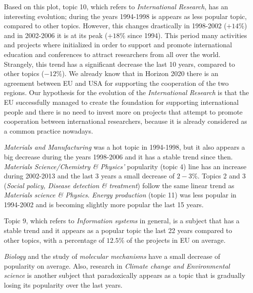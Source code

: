 \documentclass[12pt]{report}
\begin{document}
Based on this plot, topic 10, which refers to \emph{International Research},
has an interesting evolution; during the years 1994-1998 is appears as
less popular topic, compared to other topics. However, this changes
drastically in 1998-2002 ($+14\%$) and in 2002-2006 it is at its peak
($+18\%$ since 1994). This period
many activities and projects where initialized in order to support and
promote international education and conferences to attract researchers
from all over the world. Strangely, this trend has a significant
decrease the last 10 years, compared to other topics ($-12\%$). We
already know that in Horizon 2020 there is an agreement between EU and
USA for supporting the cooperation of the two regions. Our hypothesis
for the evolution of the \emph{International Research} is that the EU
successfully managed to create the foundation for supporting
international people and there is no need to invest more on projects
that attempt to promote cooperation between international researchers,
because it is already considered as a common practice nowadays.

\emph{Materials and Manufacturing} was a hot topic in 1994-1998, but it also
appears a big decrease during the years 1998-2006 and it has a stable
trend since then. \emph{Materials Science/Chemistry \& Physics'} popularity
(topic 4) line has an increase during 2002-2013 and the last 3 years a
small decrease of $2-3\%$. Topics 2 and 3 (\emph{Social policy, Disease
detection \& treatment}) follow the same linear trend as \emph{Materials
science \& Physics}. \emph{Energy production} (topic 11) was less popular in
1994-2002 and is becoming slightly more popular the last 15
years.

Topic 9, which refers to \emph{Information systems} in general, is a subject that has a
stable trend and it appears as a popular topic the last 22 years compared to
other topics, with a percentage of $12.5\%$ of the projects in EU on average.

\emph{Biology} and the study of \emph{molecular mechanisms} have a small decrease of
popularity on average. Also,
research in \emph{Climate change and Environmental science} is another
subject that paradoxically appears as a topic that is gradually losing
its popularity over the last years.
\end{document}
